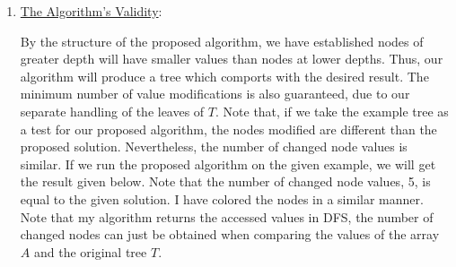 \begin{solution}
\begin{enumerate}
        \item \underline{The Algorithm's Validity}:

        \hop
        By the structure of the proposed algorithm, we have established nodes of greater depth will have smaller values than nodes at lower depths. Thus, our algorithm will produce a tree which comports with the desired result. The minimum number of value modifications is also guaranteed, due to our separate handling of the leaves of $T$. Note that, if we take the example tree as a test for our proposed algorithm, the nodes modified are different than the proposed solution. Nevertheless, the number of changed node values is similar. If we run the proposed algorithm on the given example, we will get the result given below. Note that the number of changed node values, 5, is equal to the given solution. I have colored the nodes in a similar manner. Note that my algorithm returns the accessed values in DFS, the number of changed nodes can just be obtained when comparing the values of the array $A$ and the original tree $T$. 
        \vspace{10mm}
        \begin{center}
        \end{center}


\end{enumerate}
\end{solution}
